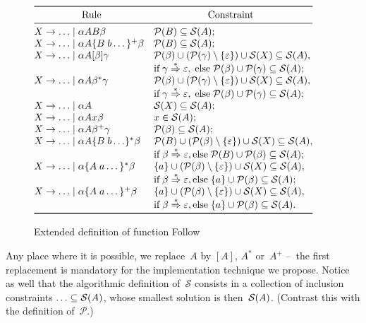 \begin{figure}
\centering
\(\begin{array}{@{}ll@{}}
\toprule
\multicolumn{1}{c}{\text{Rule}} & \multicolumn{1}{c}{\text{Constraint}}\\
\midrule
  X \rightarrow \ldots \mid \alpha A B \beta
& \first{B} \subseteq \follow{A};\\
  X \rightarrow \ldots \mid \alpha A \{B \; b \dots\}^+ \beta
& \first{B} \subseteq \follow{A};\\
  X \rightarrow \ldots \mid \alpha A [\beta] \gamma
& \first{\beta} \cup (\first{\gamma} \setminus
  \{\varepsilon\}) \cup \follow{X} \subseteq \follow{A},\\
& \text{if} \; \gamma \stackrel{*}{\Rightarrow} \varepsilon, \;
  \text{else} \; \first{\beta} \cup \first{\gamma} \subseteq \follow{A};\\
  X \rightarrow \ldots \mid \alpha A \beta^* \gamma
& \first{\beta} \cup (\first{\gamma} \setminus
  \{\varepsilon\}) \cup \follow{X} \subseteq \follow{A},\\
& \text{if} \; \gamma \stackrel{*}{\Rightarrow} \varepsilon, \;
  \text{else} \; \first{\beta} \cup \first{\gamma} \subseteq \follow{A};\\
  X \rightarrow \ldots \mid \alpha A
& \follow{X} \subseteq \follow{A};\\
  X \rightarrow \ldots \mid \alpha A x \beta
& x \in \follow{A};\\
  X \rightarrow \ldots \mid \alpha A \beta^+ \gamma
& \first{\beta} \subseteq \follow{A};\\
  X \rightarrow \ldots \mid \alpha A \{B \; b \ldots \}^* \beta
& \first{B} \cup (\first{\beta} \setminus \{\varepsilon\}) \cup
  \follow{X} \subseteq \follow{A},\\
& \text{if} \; \beta \stackrel{*}{\Rightarrow} \varepsilon,
  \text{else} \; \first{B} \cup \first{\beta} \subseteq \follow{A};\\
  X \rightarrow \ldots \mid \alpha \{A \; a \dots\}^* \beta
& \{a\} \cup (\first{\beta} \setminus \{\varepsilon\}) \cup \follow{X}
  \subseteq \follow{A},\\
& \text{if} \; \beta \stackrel{*}{\Rightarrow} \varepsilon,
  \text{else} \; \{a\} \cup \first{\beta} \subseteq \follow{A};\\
  X \rightarrow \ldots \mid \alpha \{A \; a \dots\}^+ \beta
& \{a\} \cup (\first{\beta} \setminus \{\varepsilon\}) \cup \follow{X}
  \subseteq \follow{A},\\
& \text{if} \; \beta \stackrel{*}{\Rightarrow} \varepsilon,
  \text{else} \; \{a\} \cup \first{\beta} \subseteq \follow{A}.\\
\bottomrule
\end{array}\)
\caption{Extended definition of function Follow\label{fig:follow_ext}}
\end{figure}
Any place where it is possible, we replace~\(A\) by \([A]\), \(A^*\)
or~\(A^+\) --~the first replacement is mandatory for the
implementation technique we propose. Notice as well that the
algorithmic definition of~\(\mathcal{S}\) consists in a collection of
inclusion constraints \(\ldots \subseteq \mathcal{S}(A)\), whose smallest
solution is then~\(\mathcal{S}(A)\). (Contrast this with the definition
of~\(\mathcal{P}\).)

